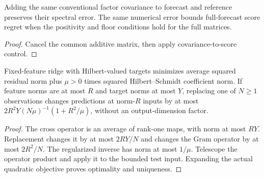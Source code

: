 \begin{theorem}\label{thm:shared-factor-covariance}
  \leanok
  Adding the same conventional factor covariance to forecast and reference
  preserves their spectral error. The same numerical error bounds full-forecast
  score regret when the positivity and floor conditions hold for the
  full matrices.
\end{theorem}
\begin{proof}\leanok
  Cancel the common additive matrix, then apply covariance-to-score control.
\end{proof}

\begin{theorem}\label{thm:vector-ridge-stability}
  \leanok
  Fixed-feature ridge with Hilbert-valued targets minimizes average squared
  residual norm plus $\mu>0$ times squared Hilbert--Schmidt coefficient norm.
  If feature norms are at most $R$ and target norms at most $Y$, replacing one
  of $N\ge1$ observations changes predictions at norm-$R$ inputs by at most
  $2R^2Y(N\mu)^{-1}(1+R^2/\mu)$, without an output-dimension factor.
\end{theorem}
\begin{proof}\leanok
  The cross operator is an average of rank-one maps, with norm at most $RY$.
  Replacement changes it by at most $2RY/N$ and changes the Gram operator by
  at most $2R^2/N$. The regularized inverse has norm at most $1/\mu$.
  Telescope the operator product and apply it to the bounded test input.
  Expanding the actual quadratic objective proves optimality and uniqueness.
\end{proof}

